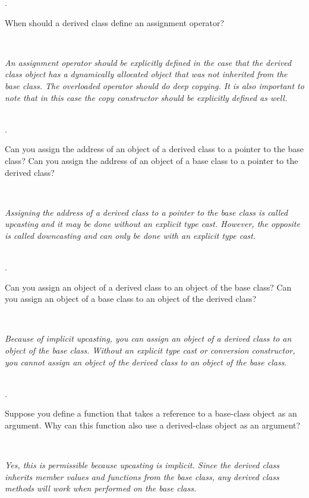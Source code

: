 \documentclass{amsart}
\begin{document}
. 
\begin{minipage}[t]{11.5 cm}
	When should a derived class define an assignment operator?
\end{minipage} \\[1ex]
\phantom{2. } 
\begin{minipage}[t]{11.5 cm}
	{\slshape 
	An assignment operator should be explicitly defined in the case
	that the derived class object has a dynamically allocated object
	that was not inherited from the base class.
	The overloaded operator should do deep copying.
	It is also important to note that in this case the copy constructor
	should be explicitly defined as well.
	}  
\end{minipage} 
\\[2ex]

. 
\begin{minipage}[t]{11.5 cm}
	Can you assign the address of an object of a derived class to a pointer to the base class? Can you assign the address of an object of a base class to a pointer to the derived class?
\end{minipage} \\[1ex]
\phantom{3. } 
\begin{minipage}[t]{11.5 cm}
	{\slshape 
	Assigning the address of a derived class to a pointer to the
	base class is called upcasting and it may be done without an 
	explicit type cast.
	However, the opposite is called downcasting and can only be done
	with an explicit type cast. 
	} 
\end{minipage} 
\\[2ex]

. 
\begin{minipage}[t]{11.5 cm}
	Can you assign an object of a derived class to an object of the base class? Can you assign an object of a base class to an object of the derived class?
\end{minipage} \\[1ex]
\phantom{2. } 
\begin{minipage}[t]{11.5 cm}
	{\slshape 
	Because of implicit upcasting, you can assign an object of a
	derived class to an object of the base class. 
	Without an explicit type cast or conversion constructor, 
	you cannot assign an object of the derived class to an object
	of the base class.
	} 
\end{minipage} 
\\[2ex]

. 
\begin{minipage}[t]{11.5 cm}
	Suppose you define a function that takes a reference to a base-class object as an argument. Why can this function also use a derived-class object as an argument?
\end{minipage} \\[1ex]
\phantom{3. } 
\begin{minipage}[t]{11.5 cm}
	{\slshape 
	Yes, this is permissible because upcasting is implicit. 
	Since the derived class inherits member values and functions
	from the base class, any derived class methods will work
	when performed on the base class.
	} 
\end{minipage} 
\\[2ex]
\end{document}
